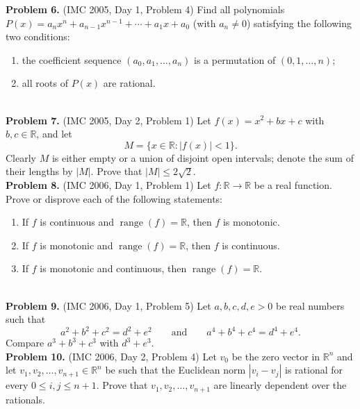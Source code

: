 \documentclass{article}
\begin{document}
\textbf{Problem 6.} (IMC 2005, Day 1, Problem 4)
Find all polynomials \( P(x) = a_n x^n + a_{n-1} x^{n-1} + \cdots + a_1 x + a_0 \) (with \( a_n \neq 0 \)) satisfying the following two conditions:
\begin{enumerate}
    \item the coefficient sequence \( (a_0, a_1, \ldots, a_n) \) is a permutation of \( (0, 1, \ldots, n) \);
    \item all roots of \( P(x) \) are rational.
\end{enumerate}
\\

\textbf{Problem 7.} (IMC 2005, Day 2, Problem 1)
Let \( f(x) = x^2 + bx + c \) with \( b, c \in \mathbb{R} \), and let
\[
M = \{ x \in \mathbb{R} : |f(x)| < 1 \}.
\]
Clearly \( M \) is either empty or a union of disjoint open intervals; denote the sum of their lengths by \( |M| \). Prove that \( |M| \leq 2\sqrt{2} \).
\\

\textbf{Problem 8.} (IMC 2006, Day 1, Problem 1)
Let \( f : \mathbb{R} \to \mathbb{R} \) be a real function. Prove or disprove each of the following statements:
\begin{enumerate}
    \item[(a)] If \( f \) is continuous and \( \operatorname{range}(f) = \mathbb{R} \), then \( f \) is monotonic.
    \item[(b)] If \( f \) is monotonic and \( \operatorname{range}(f) = \mathbb{R} \), then \( f \) is continuous.
    \item[(c)] If \( f \) is monotonic and continuous, then \( \operatorname{range}(f) = \mathbb{R} \).
\end{enumerate}
\\

\textbf{Problem 9.} (IMC 2006, Day 1, Problem 5)
Let \( a, b, c, d, e > 0 \) be real numbers such that
\[
a^2 + b^2 + c^2 = d^2 + e^2 \qquad \text{and} \qquad a^4 + b^4 + c^4 = d^4 + e^4.
\]
Compare \( a^3 + b^3 + c^3 \) with \( d^3 + e^3 \).
\\

\textbf{Problem 10.} (IMC 2006, Day 2, Problem 4)
Let \( v_0 \) be the zero vector in \( \mathbb{R}^n \) and let \( v_1, v_2, \ldots, v_{n+1} \in \mathbb{R}^n \) be such that the Euclidean norm \( |v_i - v_j| \) is rational for every \( 0 \leq i, j \leq n+1 \). Prove that \( v_1, v_2, \ldots, v_{n+1} \) are linearly dependent over the rationals.
\end{document}

